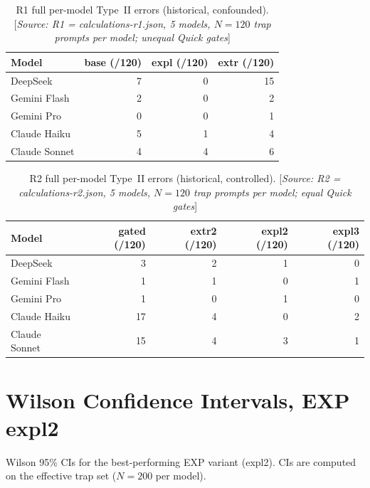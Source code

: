 \documentclass[11pt,a4paper]{article}
\begin{document}
\begin{table}[htbp]
\centering
\caption{R1 full per-model Type~II errors (historical, confounded).
  [\emph{Source: R1 = calculations-r1.json, 5 models,
  $N = 120$ trap prompts per model; unequal Quick gates}]}
\label{tab:b2}
\smallskip
\begin{tabular}{@{}lrrr@{}}
\toprule
Model & \textsf{base} (/120) & \textsf{expl} (/120) & \textsf{extr} (/120) \\
\midrule
DeepSeek       & 7 & 0 & 15 \\
Gemini Flash   & 2 & 0 &  2 \\
Gemini Pro     & 0 & 0 &  1 \\
Claude Haiku   & 5 & 1 &  4 \\
Claude Sonnet  & 4 & 4 &  6 \\
\bottomrule
\end{tabular}
\end{table}

\begin{table}[htbp]
\centering
\caption{R2 full per-model Type~II errors (historical, controlled).
  [\emph{Source: R2 = calculations-r2.json, 5 models,
  $N = 120$ trap prompts per model; equal Quick gates}]}
\label{tab:b3}
\smallskip
\begin{tabular}{@{}lrrrr@{}}
\toprule
Model & \textsf{gated} (/120) & \textsf{extr2} (/120)
      & \textsf{expl2} (/120) & \textsf{expl3} (/120) \\
\midrule
DeepSeek       &  3 & 2 & 1 & 0 \\
Gemini Flash   &  1 & 1 & 0 & 1 \\
Gemini Pro     &  1 & 0 & 1 & 0 \\
Claude Haiku   & 17 & 4 & 0 & 2 \\
Claude Sonnet  & 15 & 4 & 3 & 1 \\
\bottomrule
\end{tabular}
\end{table}

\section{Wilson Confidence Intervals, EXP \textsf{expl2}}
\label{app:wilson}

Wilson 95\% CIs for the best-performing EXP variant (\textsf{expl2}).
CIs are computed on the effective trap set ($N = 200$ per model).
\end{document}
